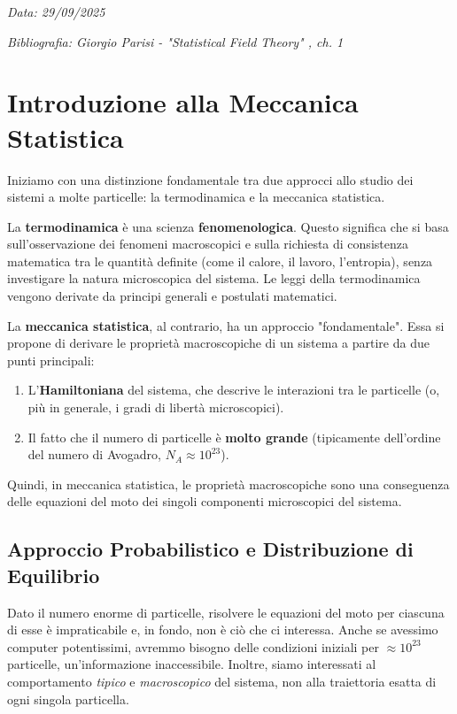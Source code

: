 \label{chap:lezione_01} %

\begin{flushright}
\textit{Data: 29/09/2025}
\end{flushright}
\textit{Bibliografia: Giorgio Parisi - "Statistical Field Theory" , ch. 1}


\section{Introduzione alla Meccanica Statistica}

Iniziamo con una distinzione fondamentale tra due approcci allo studio dei sistemi a molte particelle: la termodinamica e la meccanica statistica.

La \textbf{termodinamica} è una scienza \textbf{fenomenologica}. Questo significa che si basa sull'osservazione dei fenomeni macroscopici e sulla richiesta di consistenza matematica tra le quantità definite (come il calore, il lavoro, l'entropia), senza investigare la natura microscopica del sistema. Le leggi della termodinamica vengono derivate da principi generali e postulati matematici.

La \textbf{meccanica statistica}, al contrario, ha un approccio "fondamentale". Essa si propone di derivare le proprietà macroscopiche di un sistema a partire da due punti principali:
\begin{enumerate}
    \item L'\textbf{Hamiltoniana} del sistema, che descrive le interazioni tra le particelle (o, più in generale, i gradi di libertà microscopici).
    \item Il fatto che il numero di particelle è \textbf{molto grande} (tipicamente dell'ordine del numero di Avogadro, $N_A \approx 10^{23}$).
\end{enumerate}
Quindi, in meccanica statistica, le proprietà macroscopiche sono una conseguenza delle equazioni del moto dei singoli componenti microscopici del sistema.

\subsection{Approccio Probabilistico e Distribuzione di Equilibrio}

Dato il numero enorme di particelle, risolvere le equazioni del moto per ciascuna di esse è impraticabile e, in fondo, non è ciò che ci interessa. Anche se avessimo computer potentissimi, avremmo bisogno delle condizioni iniziali per $\approx 10^{23}$ particelle, un'informazione inaccessibile. Inoltre, siamo interessati al comportamento \textit{tipico} e \textit{macroscopico} del sistema, non alla traiettoria esatta di ogni singola particella.

